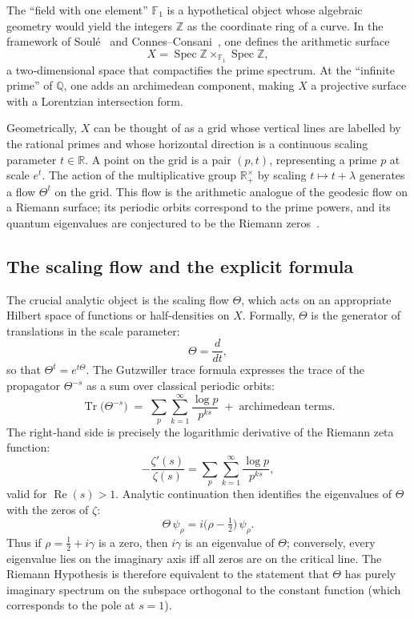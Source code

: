 \documentclass[11pt,a4paper]{article}
\begin{document}
The ``field with one element'' $\mathbb{F}_1$ is a hypothetical object whose algebraic geometry would yield the integers $\mathbb{Z}$ as the coordinate ring of a curve.  In the framework of Soul\'e~\cite{soule2004} and Connes–Consani~\cite{connesconsani2010}, one defines the arithmetic surface
\[
X = \operatorname{Spec}\mathbb{Z} \times_{\mathbb{F}_1} \operatorname{Spec}\mathbb{Z},
\]
a two‑dimensional space that compactifies the prime spectrum.  At the ``infinite prime'' of $\mathbb{Q}$, one adds an archimedean component, making $X$ a projective surface with a Lorentzian intersection form.

Geometrically, $X$ can be thought of as a grid whose vertical lines are labelled by the rational primes and whose horizontal direction is a continuous scaling parameter $t\in\mathbb{R}$.  A point on the grid is a pair $(p,t)$, representing a prime $p$ at scale $e^t$.  The action of the multiplicative group $\mathbb{R}_+^\times$ by scaling $t\mapsto t+\lambda$ generates a flow $\Theta^t$ on the grid.  This flow is the arithmetic analogue of the geodesic flow on a Riemann surface; its periodic orbits correspond to the prime powers, and its quantum eigenvalues are conjectured to be the Riemann zeros~\cite{berry_keating1999}.

\subsection{The scaling flow and the explicit formula}

The crucial analytic object is the scaling flow $\Theta$, which acts on an appropriate Hilbert space of functions or half‑densities on $X$.  Formally, $\Theta$ is the generator of translations in the scale parameter:
\[
\Theta = \frac{d}{dt},
\]
so that $\Theta^t = e^{t\Theta}$.  The Gutzwiller trace formula expresses the trace of the propagator $\Theta^{-s}$ as a sum over classical periodic orbits:
\begin{equation}\label{eq:trace}
\operatorname{Tr}\!\big(\Theta^{-s}\big) \;=\; \sum_{p}\sum_{k=1}^{\infty} \frac{\log p}{p^{ks}} \;+\; \text{archimedean terms}.
\end{equation}
The right‑hand side is precisely the logarithmic derivative of the Riemann zeta function:
\[
-\frac{\zeta'(s)}{\zeta(s)} = \sum_{p}\sum_{k=1}^{\infty} \frac{\log p}{p^{ks}},
\]
valid for $\operatorname{Re}(s)>1$.  Analytic continuation then identifies the eigenvalues of $\Theta$ with the zeros of $\zeta$:
\[
\Theta\, \psi_\rho = i\Big(\rho-\tfrac12\Big)\,\psi_\rho.
\]
Thus if $\rho = \frac12 + i\gamma$ is a zero, then $i\gamma$ is an eigenvalue of $\Theta$; conversely, every eigenvalue lies on the imaginary axis iff all zeros are on the critical line.  The Riemann Hypothesis is therefore equivalent to the statement that $\Theta$ has purely imaginary spectrum on the subspace orthogonal to the constant function (which corresponds to the pole at $s=1$).
\end{document}
